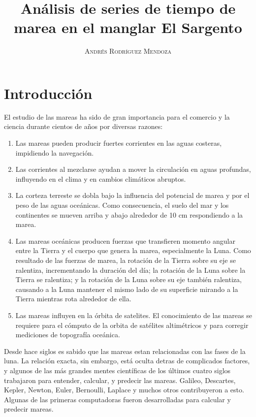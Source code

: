 \documentclass[paper=letter, fontsize=12pt,spanish]{article}
\title{\vspace{-15mm}\fontsize{24pt}{10pt}\selectfont\textbf{Análisis de series de tiempo de marea en el manglar El Sargento}} %
\author{
\large
{\textsc{Andrés Rodríguez Mendoza}}\\[2mm]
}
\date{}
\begin{document}
\maketitle %
\thispagestyle{fancy} %

\graphicspath{{./Graphs/}}

\section{Introducci\'on}
El estudio de las mareas ha sido de gran importancia para el comercio y la ciencia durante cientos de años por diversas razones:
\begin{enumerate}
\item Las mareas pueden producir fuertes corrientes en las aguas costeras, impidiendo la navegación.
\item Las corrientes al mezclarse ayudan a mover la circulación en aguas profundas, influyendo en el clima y en cambios climáticos abruptos.
\item La corteza terreste se dobla bajo la influencia del potencial de marea y por el peso de las aguas oceánicas. Como consecuencia, el suelo del mar y los continentes se mueven arriba y abajo alrededor de 10 cm respondiendo a la marea.
\item Las mareas oceánicas producen fuerzas que transfieren momento angular entre la Tierra y el cuerpo que genera la marea, especialmente la Luna. Como resultado de las fuerzas de marea, la rotación de la Tierra sobre su eje se ralentiza, incrementando la duración del día; la rotación de la Luna sobre la Tierra se ralentiza; y la rotación de la Luna sobre su eje también ralentiza, causando a la Luna mantener el mismo lado de su superficie mirando a la Tierra mientras rota alrededor de ella.
\item Las mareas influyen en la órbita de satelites. El conocimiento de las mareas se requiere para el cómputo de la orbita de satélites altimétricos y para corregir mediciones de topografía oceánica.
\end{enumerate}

Desde hace siglos es sabido que las mareas estan relacionadas con las fases de la luna. La relación exacta, sin embargo, está oculta detras de complicados factores, y algunos de las más grandes mentes científicas de los últimos cuatro siglos trabajaron para entender, calcular, y predecir las mareas. Galileo, Descartes, Kepler, Newton, Euler, Bernoulli, Laplace y muchos otros contribuyeron a esto. Algunas de las primeras computadoras fueron desarrolladas para calcular y predecir mareas. 
\end{document}
